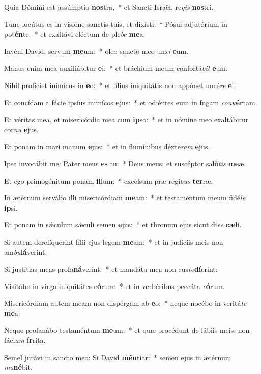 \item Quia Dómini est assúmptio \textbf{nos}tra,~* et Sancti Israël, re\textit{gis} \textbf{nos}tri.
\item Tunc locútus es in visióne sanctis tuis, et dixísti:~† Pósui adjutórium in pot\textbf{én}te:~* et exaltávi eléctum de ple\textit{be} \textbf{me}a.
\item Invéni David, servum \textbf{me}um:~* óleo sancto meo un\textit{xi} \textbf{e}um.
\item Manus enim mea auxiliábitur \textbf{e}i:~* et bráchium meum confortá\textit{bit} \textbf{e}um.
\item Nihil profíciet inimícus in \textbf{e}o:~* et fílius iniquitátis non appónet nocé\textit{re} \textbf{e}i.
\item Et concídam a fácie ipsíus inimícos \textbf{e}jus:~* et odiéntes eum in fugam \textit{con}\textbf{vér}tam.
\item Et véritas mea, et misericórdia mea cum \textbf{ip}so:~* et in nómine meo exaltábitur cor\textit{nu} \textbf{e}jus.
\item Et ponam in mari manum \textbf{e}jus:~* et in flumínibus déxte\textit{ram} \textbf{e}jus.
\item Ipse invocábit me: Pater meus \textbf{es} tu:~* Deus meus, et suscéptor salú\textit{tis} \textbf{me}æ.
\item Et ego primogénitum ponam \textbf{il}lum:~* excélsum præ régi\textit{bus} \textbf{ter}ræ.
\item In ætérnum servábo illi misericórdiam \textbf{me}am:~* et testaméntum meum fidé\textit{le} \textbf{ip}si.
\item Et ponam in sǽculum sǽculi semen \textbf{e}jus:~* et thronum ejus sicut di\textit{es} \textbf{cæ}li.
\item Si autem derelíquerint fílii ejus legem \textbf{me}am:~* et in judíciis meis non am\textit{bu}\textbf{lá}verint.
\item Si justítias meas profa\textbf{ná}verint:~* et mandáta mea non cus\textit{to}\textbf{dí}erint:
\item Visitábo in virga iniquitátes e\textbf{ó}rum:~* et in verbéribus peccáta \textit{e}\textbf{ó}rum.
\item Misericórdiam autem meam non dispérgam ab \textbf{e}o:~* neque nocébo in veritá\textit{te} \textbf{me}a:
\item Neque profanábo testaméntum \textbf{me}um:~* et quæ procédunt de lábiis meis, non fáci\textit{am} \textbf{ír}rita.
\item Semel jurávi in sancto meo: Si David \textbf{mén}tiar:~* semen ejus in ætérnum \textit{ma}\textbf{né}bit.
